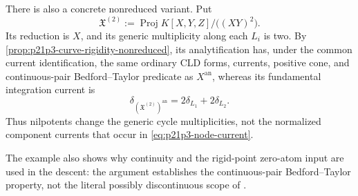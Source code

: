 \begin{example}
There is also a concrete nonreduced variant.  Put
\[
 \mathfrak X^{(2)}
   :=\operatorname{Proj}K[X,Y,Z]/\bigl((XY)^2\bigr).
\]
Its reduction is \(X\), and its generic multiplicity along each \(L_i\) is
two.  By \cref{prop:p21p3-curve-rigidity-nonreduced}, its analytification
has, under the common current identification, the same ordinary CLD forms,
currents, positive cone, and continuous-pair Bedford--Taylor predicate as
\(X^{\mathrm{an}}\), whereas its fundamental integration current is
\begin{equation}
        \delta_{(\mathfrak X^{(2)})^{\mathrm{an}}}
          =2\delta_{L_1}+2\delta_{L_2}.
 \label{eq:p21p3-double-node-fundamental-current}
\end{equation}
Thus nilpotents change the generic cycle multiplicities, not the normalized
component currents that occur in \eqref{eq:p21p3-node-current}.

The example also shows why continuity and the rigid-point zero-atom input
are used in the descent: the argument establishes the continuous-pair
Bedford--Taylor property, not the literal possibly discontinuous scope of
\cite[Definition~8.6.2]{CLD25}.
\end{example}
